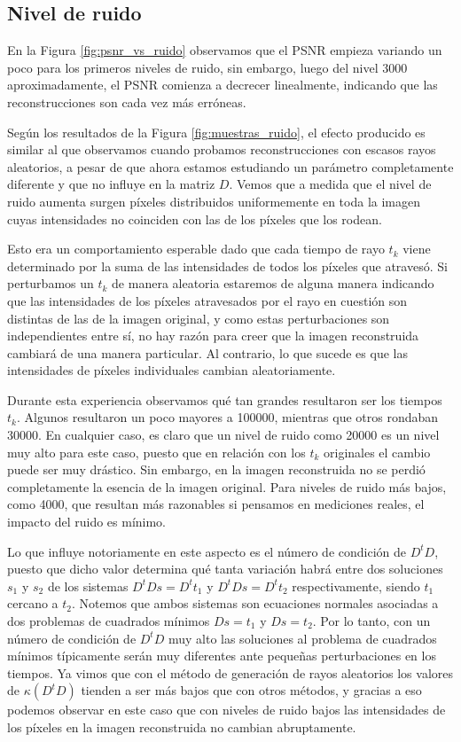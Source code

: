 \documentclass[a4paper]{article}
\begin{document}
\subsection{Nivel de ruido}

En la Figura \ref{fig:psnr_vs_ruido} observamos que el PSNR empieza variando un poco para los primeros niveles de ruido, sin embargo, luego del 
nivel 3000 aproximadamente, el PSNR comienza a decrecer linealmente, indicando que las reconstrucciones son cada vez más erróneas.

Según los resultados de la Figura \ref{fig:muestras_ruido}, el efecto producido es similar al que observamos cuando probamos reconstrucciones con 
escasos rayos aleatorios, a pesar de que ahora estamos estudiando un parámetro completamente diferente y que no influye en la matriz $D$. Vemos que 
a medida que el nivel de ruido aumenta surgen píxeles distribuidos uniformemente en toda la imagen cuyas intensidades no coinciden con las de los 
píxeles que los rodean.

Esto era un comportamiento esperable dado que cada tiempo de rayo $t_k$ viene determinado por la suma de las intensidades de todos los píxeles que 
atravesó. Si perturbamos un $t_k$ de manera aleatoria estaremos de alguna manera indicando que las intensidades de los píxeles atravesados por el 
rayo en cuestión son distintas de las de la imagen original, y como estas perturbaciones son independientes entre sí, no hay razón para creer que la 
imagen reconstruida cambiará de una manera particular. Al contrario, lo que sucede es que las intensidades de píxeles individuales cambian 
aleatoriamente.

Durante esta experiencia observamos qué tan grandes resultaron ser los tiempos $t_k$. Algunos resultaron un poco mayores a 100000, mientras que 
otros rondaban 30000. En cualquier caso, es claro que un nivel de ruido como 20000 es un nivel muy alto para este caso, puesto que en relación 
con los $t_k$ originales el cambio puede ser muy drástico. Sin embargo, en la imagen reconstruida no se perdió completamente la esencia de la imagen 
original. Para niveles de ruido más bajos, como 4000, que resultan más razonables si pensamos en mediciones reales, el impacto del ruido es mínimo.

Lo que influye notoriamente en este aspecto es el número de condición de $D^tD$, puesto que dicho valor determina qué tanta variación habrá 
entre dos soluciones $s_1$ y $s_2$ de los sistemas $D^tDs = D^tt_1$ y $D^tDs = D^tt_2$ respectivamente, siendo $t_1$ cercano a $t_2$. Notemos que 
ambos sistemas son ecuaciones normales asociadas a dos problemas de cuadrados mínimos $Ds = t_1$ y $Ds = t_2$. Por lo tanto, con un número de 
condición de $D^tD$ muy alto las soluciones al problema de cuadrados mínimos típicamente serán muy diferentes ante pequeñas perturbaciones en los 
tiempos. Ya vimos que con el método de generación de rayos aleatorios los valores de $\kappa(D^tD)$ tienden a ser más bajos que con otros métodos, 
y gracias a eso podemos observar en este caso que con niveles de ruido bajos las intensidades de los píxeles en la imagen reconstruida no 
cambian abruptamente.
\end{document}
